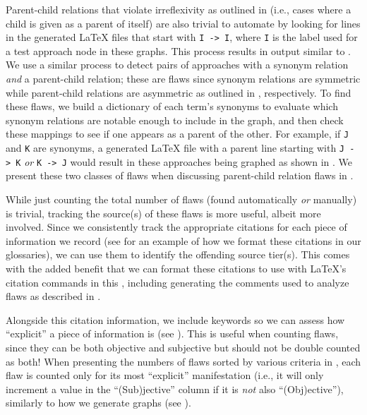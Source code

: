 \label{selfParDef}
Parent-child relations that violate irreflexivity as outlined in
 (i.e., cases where a child is given as a parent of itself)
are also trivial to automate by looking for lines in the
generated \LaTeX{} files that start with \texttt{I~->~I}, where \texttt{I}
is the label used for a test approach node in these graphs. This process
results in output similar to .%
\label{parSynDef} We use a similar
process to detect pairs of approaches with a synonym relation \emph{and} a
parent-child relation; these are flaws since synonym relations are symmetric
while parent-child relations are asymmetric as outlined in , respectively. To find these flaws, we build a dictionary of
each term's synonyms to evaluate which synonym relations are notable enough
to include in the graph, and then check these mappings to see if one appears
as a parent of the other. For example, if \texttt{J} and \texttt{K} are
synonyms, a generated \LaTeX{} file with a parent line starting with
\texttt{J~->~K} \emph{or} \texttt{K~->~J} would result in these approaches
being graphed as shown in . We present these two
classes of flaws when discussing parent-child relation flaws in .

While just counting the total number of flaws (found automatically \emph{or}
manually) is trivial, tracking
the source(s) of these flaws is more useful, albeit more involved. Since
we consistently track the appropriate citations for each piece of information
we record (see  for an example %
of how we format these citations in our glossaries), we can use them to
identify the offending source tier(s). This comes with the added benefit that
we can format these citations to use with \LaTeX{}'s citation commands in this
\docType{}, including generating the comments used to analyze flaws as
described in .

\label{auto-flaw-analysis-explicitness}
Alongside this citation information, we include keywords so we can assess how
``explicit'' a piece of information is (see ). This is
useful when counting flaws, since they can be both objective and subjective but
should not be double counted as both! When presenting
the numbers of flaws sorted by various criteria in
, each flaw is counted only for its
most ``explicit'' manifestation (i.e., it will only increment a value in the
``(Sub)jective'' column if it is \emph{not} also ``(Obj)ective''),
similarly to how we generate graphs (see ).

